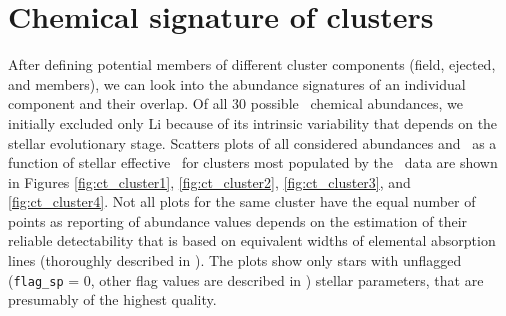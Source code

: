\section{Chemical signature of clusters}
\label{sec:chem_cluster}
After defining potential members of different cluster components (field, ejected, and members), we can look into the abundance signatures of an individual component and their overlap. Of all 30 possible \Gh\ chemical abundances, we initially excluded only Li because of its intrinsic variability that depends on the stellar evolutionary stage. Scatters plots of all considered abundances and \Feh\ as a function of stellar effective \Teff\ for clusters most populated by the \Gh\ data are shown in Figures \ref{fig:ct_cluster1}, \ref{fig:ct_cluster2}, \ref{fig:ct_cluster3}, and \ref{fig:ct_cluster4}. Not all plots for the same cluster have the equal number of points as reporting of abundance values depends on the estimation of their reliable detectability that is based on equivalent widths of elemental absorption lines (thoroughly described in \citet{buder2020}). The plots show only stars with unflagged (\texttt{flag\_sp} = 0, other flag values are described in \citet{buder2020}) stellar parameters, that are presumably of the highest quality.

